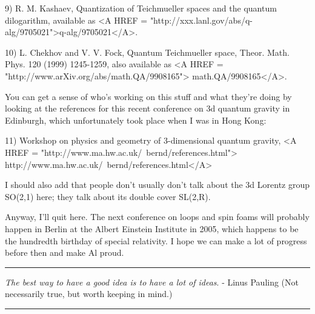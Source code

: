 9) R. M. Kashaev, Quantization of Teichmueller spaces and the quantum 
dilogarithm, available as <A HREF = "http://xxx.lanl.gov/abs/q-alg/9705021">q-alg/9705021</A>.

10) L. Chekhov and V. V. Fock, Quantum Teichmueller space, 
Theor. Math. Phys. 120 (1999) 1245-1259, also available as 
<A HREF = "http://www.arXiv.org/abs/math.QA/9908165">
math.QA/9908165</A>.

You can get a sense of who's working on this stuff and what they're
doing by looking at the references for this recent conference on 3d 
quantum gravity in Edinburgh, which unfortunately took place when I 
was in Hong Kong:

11) Workshop on physics and geometry of 3-dimensional quantum gravity,
<A HREF = "http://www.ma.hw.ac.uk/~bernd/references.html">
http://www.ma.hw.ac.uk/~bernd/references.html</A>

I should also add that people don't usually don't talk about the 3d 
Lorentz group SO(2,1) here; they talk about its double cover SL(2,R).

Anyway, I'll quit here.  The next conference on loops and spin foams
will probably happen in Berlin at the Albert Einstein Institute in 
2005, which happens to be the hundredth birthday of special relativity.
I hope we can make a lot of progress before then and make Al proud.

\par\noindent\rule{\textwidth}{0.4pt}
\emph{The best way to have a good idea is to have a lot of ideas}. -
Linus Pauling
(Not necessarily true, but worth keeping in mind.)

\par\noindent\rule{\textwidth}{0.4pt}


